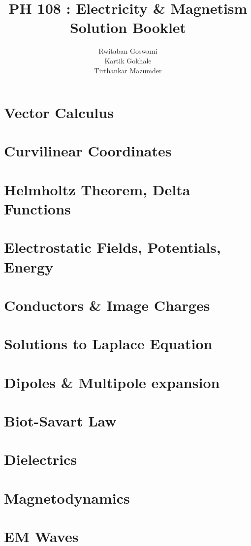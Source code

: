 \documentclass[answers,12pt]{exam}
\title{PH 108 : Electricity \& Magnetism \\ Solution Booklet}
\author{\Large Rwitaban Goswami\\
\footnotesize Kartik Gokhale\\
\footnotesize  Tirthankar Mazumder}
\date{}
\begin{document}
\maketitle

\newpage
\tableofcontents

\newpage

\section{Vector Calculus}


\section{Curvilinear Coordinates}


\section{Helmholtz Theorem, Delta Functions}


\section{Electrostatic Fields, Potentials, Energy}


\section{Conductors \& Image Charges}


\section{Solutions to Laplace Equation}


\section{Dipoles \& Multipole expansion}


\section{Biot-Savart Law}


\section{Dielectrics}


\section{Magnetodynamics}


\section{EM Waves}

\end{document}
